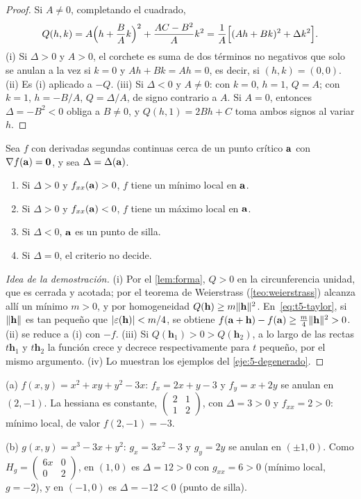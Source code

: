 \begin{proof}
Si $A\neq0$, completando el cuadrado,
\[
Q(h,k)=A\Bigl(h+\frac BAk\Bigr)^2+\frac{AC-B^2}{A}k^2=\frac1A\Bigl[(Ah+Bk)^2+\Delta k^2\Bigr].
\]
(i) Si $\Delta>0$ y $A>0$, el corchete es suma de dos términos no negativos que solo se anulan a la vez si $k=0$ y $Ah+Bk=Ah=0$, es decir, si $(h,k)=(0,0)$. (ii) Es (i) aplicado a $-Q$. (iii) Si $\Delta<0$ y $A\neq0$: con $k=0$, $h=1$, $Q=A$; con $k=1$, $h=-B/A$, $Q=\Delta/A$, de signo contrario a $A$. Si $A=0$, entonces $\Delta=-B^2<0$ obliga a $B\neq0$, y $Q(h,1)=2Bh+C$ toma ambos signos al variar $h$.
\end{proof}

\begin{teorema}\label{teo:hessiano}
Sea $f$ con derivadas segundas continuas cerca de un punto crítico $\mathbf{a}$ con $\nabla f(\mathbf{a})=\mathbf{0}$, y sea $\Delta=\Delta(\mathbf{a})$.
\begin{enumerate}
  \item Si $\Delta>0$ y $f_{xx}(\mathbf{a})>0$, $f$ tiene un mínimo local en $\mathbf{a}$.
  \item Si $\Delta>0$ y $f_{xx}(\mathbf{a})<0$, $f$ tiene un máximo local en $\mathbf{a}$.
  \item Si $\Delta<0$, $\mathbf{a}$ es un punto de silla.
  \item Si $\Delta=0$, el criterio no decide.
\end{enumerate}
\end{teorema}

\begin{proof}[Idea de la demostración]
(i) Por el \cref{lem:forma}, $Q>0$ en la circunferencia unidad, que es cerrada y acotada; por el teorema de Weierstrass (\cref{teo:weierstrass}) alcanza allí un mínimo $m>0$, y por homogeneidad $Q(\mathbf h)\ge m\lVert\mathbf h\rVert^2$. En~\eqref{eq:t5-taylor}, si $\lVert\mathbf h\rVert$ es tan pequeño que $\lvert\varepsilon(\mathbf h)\rvert<m/4$, se obtiene $f(\mathbf{a}+\mathbf h)-f(\mathbf{a})\ge\frac m4\lVert\mathbf h\rVert^2>0$. (ii) se reduce a (i) con $-f$. (iii) Si $Q(\mathbf h_1)>0>Q(\mathbf h_2)$, a lo largo de las rectas $t\mathbf h_1$ y $t\mathbf h_2$ la función crece y decrece respectivamente para $t$ pequeño, por el mismo argumento. (iv) Lo muestran los ejemplos del \cref{eje:5-degenerado}.
\end{proof}

\begin{ejemplo}\label{ej:t5-hessiano}
(a) $f(x,y)=x^2+xy+y^2-3x$: $f_x=2x+y-3$ y $f_y=x+2y$ se anulan en $(2,-1)$. La hessiana es constante, $\begin{pmatrix}2&1\\1&2\end{pmatrix}$, con $\Delta=3>0$ y $f_{xx}=2>0$: mínimo local, de valor $f(2,-1)=-3$.

(b) $g(x,y)=x^3-3x+y^2$: $g_x=3x^2-3$ y $g_y=2y$ se anulan en $(\pm1,0)$. Como $H_g=\begin{pmatrix}6x&0\\0&2\end{pmatrix}$, en $(1,0)$ es $\Delta=12>0$ con $g_{xx}=6>0$ (mínimo local, $g=-2$), y en $(-1,0)$ es $\Delta=-12<0$ (punto de silla).
\end{ejemplo}


